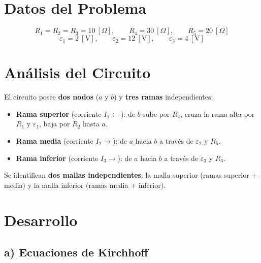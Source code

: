 \documentclass[12pt,letterpaper]{article}
\begin{document}
\section*{Datos del Problema}

\[
    R_1 = R_2 = R_3 = 10\ [\Omega],\qquad
    R_4 = 30\ [\Omega],\qquad
    R_5 = 20\ [\Omega]
\]
\[
    \varepsilon_1 = 2\ [\text{V}],\qquad
    \varepsilon_2 = 12\ [\text{V}],\qquad
    \varepsilon_3 = 4\ [\text{V}]
\]

\section*{An\'alisis del Circuito}

El circuito posee \textbf{dos nodos} ($a$ y $b$) y \textbf{tres ramas} independientes:

\begin{itemize}
    \item \textbf{Rama superior} (corriente $I_1 \leftarrow$): de $b$ sube por
          \textcolor{colR4}{$R_4$}, cruza la rama alta por
          \textcolor{colR1}{$R_1$} y \textcolor{colE1}{$\varepsilon_1$},
          baja por \textcolor{colR2}{$R_2$} hasta $a$.
    \item \textbf{Rama media} (corriente $I_2 \rightarrow$): de $a$ hacia $b$
          a trav\'es de \textcolor{colE2}{$\varepsilon_2$} y
          \textcolor{colR5}{$R_5$}.
    \item \textbf{Rama inferior} (corriente $I_3 \rightarrow$): de $a$ hacia $b$
          a trav\'es de \textcolor{colE3}{$\varepsilon_3$} y
          \textcolor{colR3}{$R_3$}.
\end{itemize}

Se identifican \textbf{dos mallas independientes}: la malla superior (ramas superior +
media) y la malla inferior (ramas media + inferior).

\section*{Desarrollo}

\subsection*{a) Ecuaciones de Kirchhoff}
\end{document}
